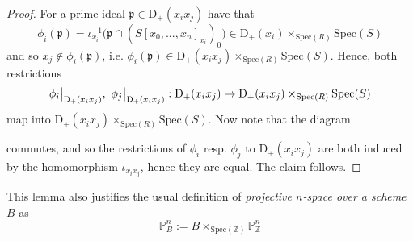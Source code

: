 \documentclass{scrartcl}
\newcommand{\Z}{\mathbb{Z}}
\newcommand{\D}[1]{\mathrm{D}_+(#1)}
\renewcommand{\P}{\mathbb{P}}
\newcommand{\p}{\mathfrak{p}}
\newcommand{\Spec}{\mathrm{Spec}}
\newcommand\restr[2]{{
    \left.\kern-\nulldelimiterspace
    #1
    \vphantom{\big|}
    \right|_{#2}
}}
\theoremstyle{definition}
\begin{document}
\begin{proof}
    For a prime ideal $\p \in \D{x_ix_j}$ have that
    \begin{equation*}
        \phi_i(\p) = \iota_{x_i}^{-1}\bigl( \p \cap (S[x_0, ..., x_n]_{x_i})_0 \bigr) \in \D{x_i} \times_{\Spec(R)} \Spec(S)
    \end{equation*}
    and so $x_j \notin \phi_i(\p)$, i.e. $\phi_i(\p) \in \D{x_ix_j} \times_{\Spec(R)} \Spec(S)$.
    Hence, both restrictions
    \begin{equation*}
        \restr{\phi_i}{\D{x_ix_j}}, \ \restr{\phi_j}{\D{x_ix_j}}: \D{x_ix_j} \to \D{x_ix_j} \times_{\Spec(R)} \Spec(S)
    \end{equation*}
    map into $\D{x_ix_j} \times_{\Spec(R)} \Spec(S)$.
    Now note that the diagram
    \begin{center}
    \end{center}
    commutes, and so the restrictions of $\phi_i$ resp. $\phi_j$ to $\D{x_ix_j}$ are both induced by the homomorphism $\iota_{x_ix_j}$, hence they are equal.
    The claim follows.
\end{proof}
This lemma also justifies the usual definition of \emph{projective $n$-space over a scheme $B$} as
\begin{equation*}
    \P_B^n := B \times_{\Spec(\Z)} \P_\Z^n
\end{equation*}
\end{document}
